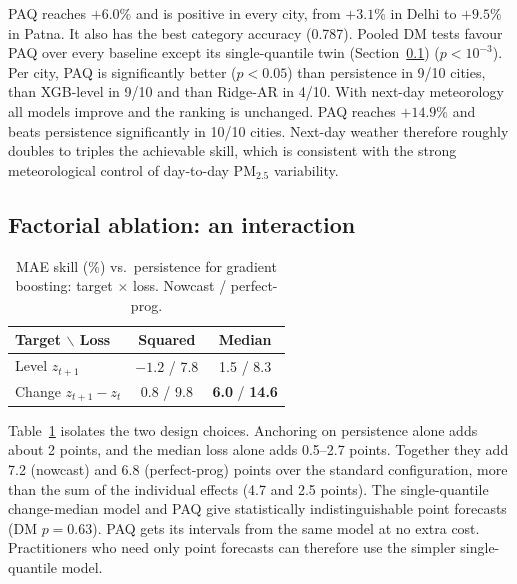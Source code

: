 \documentclass[conference]{IEEEtran}
\begin{document}
PAQ reaches $+6.0\%$ and is positive in every city, from $+3.1\%$ in Delhi to
$+9.5\%$ in Patna. It also has the best category accuracy (0.787). Pooled DM tests favour PAQ
over every baseline except its single-quantile twin (Section~\ref{sec:fact}) ($p<10^{-3}$).
Per city, PAQ is significantly better ($p<0.05$) than persistence in 9/10 cities, than
XGB-level in 9/10 and than Ridge-AR in 4/10. With next-day meteorology all models improve and the
ranking is unchanged. PAQ reaches $+14.9\%$ and beats persistence significantly in 10/10 cities.
Next-day weather therefore roughly doubles to triples the achievable skill, which is consistent with
the strong meteorological control of day-to-day PM$_{2.5}$ variability.

\subsection{Factorial ablation: an interaction}\label{sec:fact}
\begin{table}[t]
\centering
\caption{MAE skill (\%) vs.\ persistence for gradient boosting: target $\times$ loss. Nowcast / perfect-prog.}
\label{tab:factorial}
\begin{tabular}{lcc}
\toprule
Target $\backslash$ Loss & Squared & Median \\
\midrule
Level $z_{t+1}$             & $-1.2$ / 7.8 & 1.5 / 8.3 \\
Change $z_{t+1}-z_t$        & 0.8 / 9.8  & \textbf{6.0} / \textbf{14.6} \\
\bottomrule
\end{tabular}
\end{table}

Table~\ref{tab:factorial} isolates the two design choices. Anchoring on
persistence alone adds about 2 points, and the median loss alone adds 0.5--2.7 points.
Together they add 7.2 (nowcast) and 6.8 (perfect-prog) points over the standard
configuration, more than the sum of the individual effects (4.7 and 2.5 points).
The single-quantile change-median model and PAQ give statistically
indistinguishable point forecasts (DM $p=0.63$). PAQ gets its intervals from the same model
at no extra cost. Practitioners who need only point forecasts can therefore use the simpler
single-quantile model.
\end{document}
